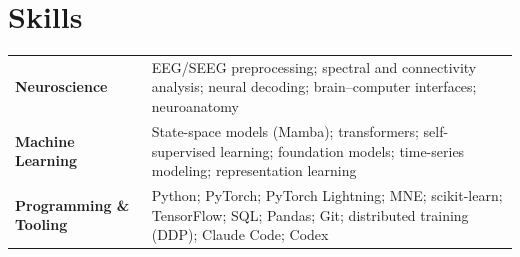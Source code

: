 \section*{Skills}

\begin{tabularx}{\linewidth}{@{}l X@{}}
    \textbf{Neuroscience} & EEG/SEEG preprocessing; spectral and connectivity analysis; neural decoding; brain–computer interfaces; neuroanatomy \\
    
    \textbf{Machine Learning} & State-space models (Mamba); transformers; self-supervised learning; foundation models; time-series modeling; representation learning \\
    
    \textbf{Programming \& Tooling} & Python; PyTorch; PyTorch Lightning; MNE; scikit-learn; TensorFlow; SQL; Pandas; Git; distributed training (DDP); Claude Code; Codex \\
\end{tabularx}
